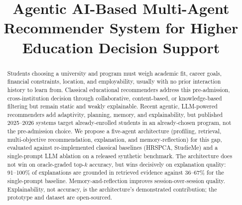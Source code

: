 \documentclass[conference]{IEEEtran}
\begin{document}
\title{Agentic AI-Based Multi-Agent Recommender System for Higher Education Decision Support}

\author{
\and
{}
\and
{}
}

\maketitle

\begin{abstract}
Students choosing a university and program must weigh academic fit, career goals,
financial constraints, location, and employability, usually with no prior interaction
history to learn from. Classical educational recommenders address this pre-admission,
cross-institution decision through collaborative, content-based, or knowledge-based
filtering but remain static and weakly explainable. Recent agentic, LLM-powered
recommenders add adaptivity, planning, memory, and explainability, but published
2025--2026 systems target already-enrolled students in an already-chosen program, not
the pre-admission choice. We propose a five-agent architecture (profiling, retrieval,
multi-objective recommendation, explanation, and memory-reflection) for this gap,
evaluated against re-implemented classical baselines (HRSPCA, StudieMe) and a
single-prompt LLM ablation on a released synthetic benchmark. The architecture does not
win on oracle-graded top-$k$ accuracy, but wins decisively on explanation quality:
91--100\% of explanations are grounded in retrieved evidence against 36--67\% for the
single-prompt baseline. Memory-and-reflection improves session-over-session quality.
Explainability, not accuracy, is the architecture's demonstrated contribution; the
prototype and dataset are open-sourced.
\end{abstract}
\end{document}
